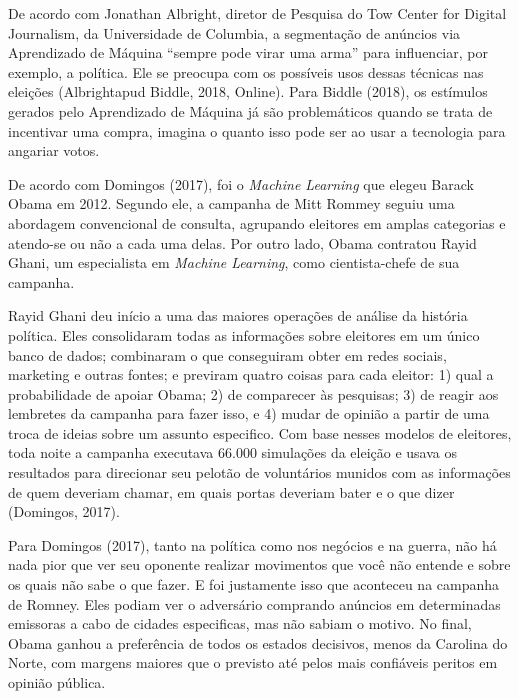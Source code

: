 De acordo com Jonathan Albright, diretor de Pesquisa do Tow Center for
Digital Journalism, da Universidade de Columbia, a segmentação de
anúncios via Aprendizado de Máquina ``sempre pode virar uma arma'' para
influenciar, por exemplo, a política. Ele se preocupa com os possíveis
usos dessas técnicas nas eleições (Albrightapud Biddle, 2018, Online).
Para Biddle (2018), os estímulos gerados pelo Aprendizado de Máquina já
são problemáticos quando se trata de incentivar uma compra, imagina o
quanto isso pode ser ao usar a tecnologia para angariar votos.

De acordo com Domingos (2017), foi o \emph{Machine Learning} que elegeu
Barack Obama em 2012. Segundo ele, a campanha de Mitt Rommey seguiu uma
abordagem convencional de consulta, agrupando eleitores em amplas
categorias e atendo-se ou não a cada uma delas. Por outro lado, Obama
contratou Rayid Ghani, um especialista em \emph{Machine Learning}, como
cientista-chefe de sua campanha.

Rayid Ghani deu início a uma das maiores operações de análise da
história política. Eles consolidaram todas as informações sobre
eleitores em um único banco de dados; combinaram o que conseguiram obter
em redes sociais, marketing e outras fontes; e previram quatro coisas
para cada eleitor: 1) qual a probabilidade de apoiar Obama; 2) de
comparecer às pesquisas; 3) de reagir aos lembretes da campanha para
fazer isso, e 4) mudar de opinião a partir de uma troca de ideias sobre
um assunto especifico. Com base nesses modelos de eleitores, toda noite
a campanha executava 66.000 simulações da eleição e usava os resultados
para direcionar seu pelotão de voluntários munidos com as informações de
quem deveriam chamar, em quais portas deveriam bater e o que dizer
(Domingos, 2017).

Para Domingos (2017), tanto na política como nos negócios e na guerra,
não há nada pior que ver seu oponente realizar movimentos que você não
entende e sobre os quais não sabe o que fazer. E foi justamente isso que
aconteceu na campanha de Romney. Eles podiam ver o adversário comprando
anúncios em determinadas emissoras a cabo de cidades especificas, mas
não sabiam o motivo. No final, Obama ganhou a preferência de todos os
estados decisivos, menos da Carolina do Norte, com margens maiores que o
previsto até pelos mais confiáveis peritos em opinião pública.

